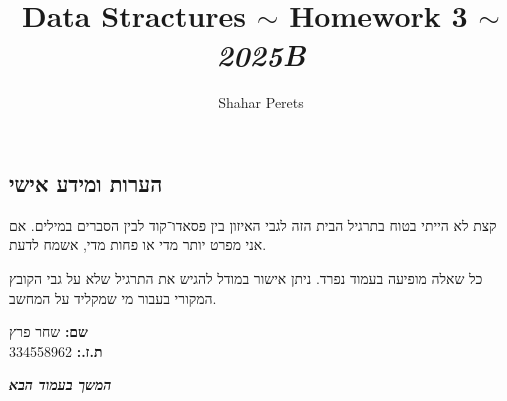 \documentclass[]{article}
\author{Shahar Perets}
\title{Data Stractures $\sim$ Homework 3 $\sim$ \textit{2025B}}
\newcommand\sen   {\begin{otherlanguage}{english}}
\newcommand\she   {\end{otherlanguage}}
\newcommand\npage {\vfil {\hfil \textbf{\textit{המשך בעמוד הבא}}} \hfil \vfil \pagebreak}
\begin{document}
	\sen\maketitle\she
    \subsection*{הערות ומידע אישי}
    קצת לא הייתי בטוח בתרגיל הבית הזה לגבי האיזון בין פסאדו־קוד לבין הסברים במילים. אם אני מפרט יותר מדי או פחות מדי, אשמח לדעת. 
    
    כל שאלה מופיעה בעמוד נפרד. ניתן אישור במודל להגיש את התרגיל שלא על גבי הקובץ המקורי בעבור מי שמקליד על המחשב. 
    
    \textbf{שם: }שחר פרץ \\
    \textbf{ת.ז.: }334558962
    
    \npage
    
	
	\section{}
\end{document}
